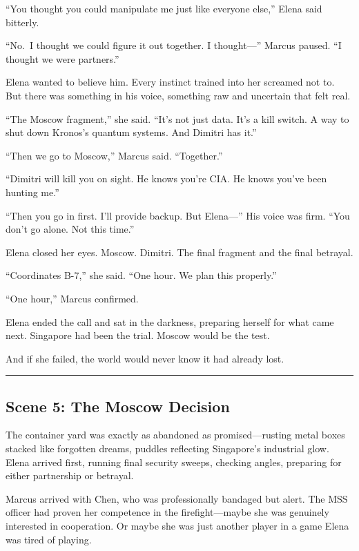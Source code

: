 ``You thought you could manipulate me just like everyone else,'' Elena said bitterly.

``No.~I thought we could figure it out together. I thought---'' Marcus paused. ``I thought we were partners.''

Elena wanted to believe him. Every instinct trained into her screamed not to. But there was something in his voice, something raw and uncertain that felt real.

``The Moscow fragment,'' she said. ``It's not just data. It's a kill switch. A way to shut down Kronos's quantum systems. And Dimitri has it.''

``Then we go to Moscow,'' Marcus said. ``Together.''

``Dimitri will kill you on sight. He knows you're CIA. He knows you've been hunting me.''

``Then you go in first. I'll provide backup. But Elena---'' His voice was firm. ``You don't go alone. Not this time.''

Elena closed her eyes. Moscow. Dimitri. The final fragment and the final betrayal.

``Coordinates B-7,'' she said. ``One hour. We plan this properly.''

``One hour,'' Marcus confirmed.

Elena ended the call and sat in the darkness, preparing herself for what came next. Singapore had been the trial. Moscow would be the test.

And if she failed, the world would never know it had already lost.

\begin{center}\rule{0.5\linewidth}{0.5pt}\end{center}

\hypertarget{scene-5-the-moscow-decision}{%
\subsection{Scene 5: The Moscow Decision}\label{scene-5-the-moscow-decision}}

The container yard was exactly as abandoned as promised---rusting metal boxes stacked like forgotten dreams, puddles reflecting Singapore's industrial glow. Elena arrived first, running final security sweeps, checking angles, preparing for either partnership or betrayal.

Marcus arrived with Chen, who was professionally bandaged but alert. The MSS officer had proven her competence in the firefight---maybe she was genuinely interested in cooperation. Or maybe she was just another player in a game Elena was tired of playing.

